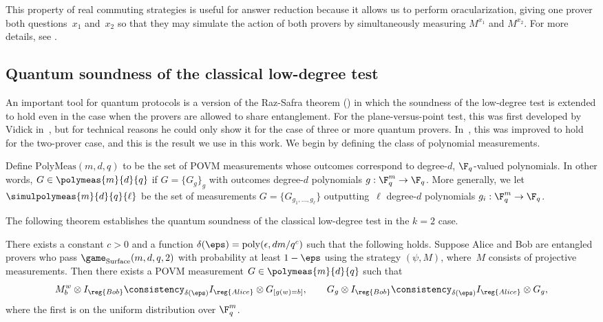 This property of real commuting strategies is useful for answer
reduction because it allows us to perform oracularization, giving one
prover both questions~$x_1$ and~$x_2$ so that they may simulate the
action of both provers by simultaneously measuring $M^{x_1}$ and $M^{x_2}$.
For more details, see .

\subsection{Quantum soundness of the classical low-degree test}\label{sec:classical-q-low-deg}

An important tool for quantum protocols
is a version of the Raz-Safra theorem ()
in which the soundness of the low-degree test is extended to hold even in the case when the provers are allowed to share entanglement.
For the plane-versus-point test, this was first developed by Vidick in~\cite{Vid16}, but for technical reasons he could only show it for the case of three or more quantum provers.
In~\cite{NV18b}, this was improved to hold for the two-prover case, and this is the result we use in this work.
We begin by defining the class of polynomial measurements.

\begin{definition}
Define $\mathrm{PolyMeas}(m, d, q)$ to be the set of POVM measurements whose outcomes correspond to degree-$d$, $\F_q$-valued polynomials.
In other words, $G \in \polymeas{m}{d}{q}$ if $G = \{G_g\}_g$ with outcomes degree-$d$ polynomials $g:\F_q^m \rightarrow \F_q$.
More generally, we let $\simulpolymeas{m}{d}{q}{\ell}$ be the set of measurements $G = \{G_{g_1, \ldots, g_\ell}\}$ outputting~$\ell$ degree-$d$ polynomials $g_i:\F_q^m \rightarrow \F_q$.
\end{definition}

The following theorem establishes the quantum soundness of the classical low-degree test in the $k = 2$ case.

\begin{theorem}\label{thm:anand-thomas-classical-low-degree}
There exists a constant $c > 0$ and a function $\delta(\eps) = \mathrm{poly}(\epsilon, dm/q^c)$ such that the following holds.
Suppose Alice and Bob are entangled provers who pass $\game_{\mathrm{Surface}}(m,d,q,2)$ with probability at least $1-\eps$
using the strategy $(\psi, M)$, where~$M$ consists of projective measurements.
Then there exists a POVM measurement $G \in \polymeas{m}{d}{q}$ such that
\begin{equation*}
M^w_b \otimes I_{\reg{Bob}} \consistency_{\delta(\eps)} I_{\reg{Alice}} \otimes G_{[g(w)=b]},
\qquad
G_g \otimes I_{\reg{Bob}} \consistency_{\delta(\eps)} I_{\reg{Alice}} \otimes G_g,
\end{equation*}
where the first is on the uniform distribution over $\F_q^m$.
\end{theorem}

